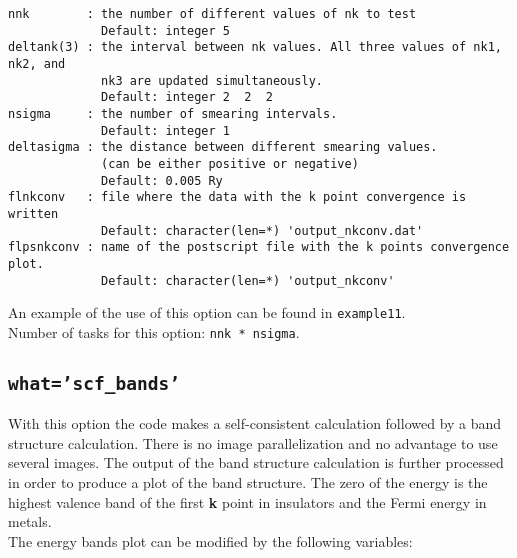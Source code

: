 \documentclass[12pt,a4paper]{article}
\begin{document}
\begin{verbatim}
nnk        : the number of different values of nk to test
             Default: integer 5
deltank(3) : the interval between nk values. All three values of nk1, nk2, and
             nk3 are updated simultaneously.
             Default: integer 2  2  2
nsigma     : the number of smearing intervals.
             Default: integer 1 
deltasigma : the distance between different smearing values.
             (can be either positive or negative)
             Default: 0.005 Ry
flnkconv   : file where the data with the k point convergence is written
             Default: character(len=*) 'output_nkconv.dat'
flpsnkconv : name of the postscript file with the k points convergence plot.
             Default: character(len=*) 'output_nkconv'
\end{verbatim}
An example of the use of this option can be found in \texttt{example11}. \\
Number of tasks for this option: \texttt{nnk * nsigma}.

\subsection{\color{web-blue}\texttt{what='scf\_bands'}}
With this option the code makes a self-consistent calculation followed 
by a band structure calculation. There is no image parallelization and no
advantage to use several images. The output of the band structure 
calculation is further processed in order to produce a plot of the band 
structure.
The zero of the energy is the highest valence band 
of the first {\bf k} point in insulators and the Fermi energy in metals. \\
The energy bands plot can be modified by the following variables:
\end{document}
